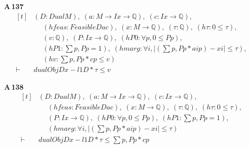 \noindent\textbf{A\,137}\quad{}
{\footnotesize\[ \begin{aligned}[t]
&(\mathit{D} : \mathit{Dual} \mathit{M}),\; (\mathit{a} : \mathit{M} \to \mathit{Ix} \to \mathbb{Q} ),\; (\mathit{c} : \mathit{Ix} \to \mathbb{Q} ),\\
&\quad \; (\mathit{hfeas} : \mathit{Feasible} \mathit{D} \mathit{a} \mathit{c}),\; (\mathit{x} : \mathit{M} \to \mathbb{Q} ),\; (\tau : \mathbb{Q} ),\; (\mathit{hτ} : 0 \leq \tau ),\\
&\quad \; (\mathit{v} : \mathbb{Q} ),\; (\mathit{P} : \mathit{Ix} \to \mathbb{Q} ),\; (\mathit{hP0} : \forall \mathit{p}, 0 \leq \mathit{P} \mathit{p}),\\
&\quad \; (\mathit{hP1} : \textstyle\sum \mathit{p}, \mathit{P} \mathit{p} = 1),\; (\mathit{hmarg} : \forall \mathit{i}, |(\textstyle\sum \mathit{p}, \mathit{P} \mathit{p} * \mathit{a} \mathit{i} \mathit{p}) - \mathit{x} \mathit{i}| \leq \tau ),\\
&\quad \; (\mathit{hv} : \textstyle\sum \mathit{p}, \mathit{P} \mathit{p} * \mathit{c} \mathit{p} \leq \mathit{v})\\
\vdash\;&\mathit{dualObj} \mathit{D} \mathit{x} - \mathit{l1} \mathit{D} * \tau \leq \mathit{v}
\end{aligned} \]}

\noindent\textbf{A\,138}\quad{}
{\footnotesize\[ \begin{aligned}[t]
&(\mathit{D} : \mathit{Dual} \mathit{M}),\; (\mathit{a} : \mathit{M} \to \mathit{Ix} \to \mathbb{Q} ),\; (\mathit{c} : \mathit{Ix} \to \mathbb{Q} ),\\
&\quad \; (\mathit{hfeas} : \mathit{Feasible} \mathit{D} \mathit{a} \mathit{c}),\; (\mathit{x} : \mathit{M} \to \mathbb{Q} ),\; (\tau : \mathbb{Q} ),\; (\mathit{hτ} : 0 \leq \tau ),\\
&\quad \; (\mathit{P} : \mathit{Ix} \to \mathbb{Q} ),\; (\mathit{hP0} : \forall \mathit{p}, 0 \leq \mathit{P} \mathit{p}),\; (\mathit{hP1} : \textstyle\sum \mathit{p}, \mathit{P} \mathit{p} = 1),\\
&\quad \; (\mathit{hmarg} : \forall \mathit{i}, |(\textstyle\sum \mathit{p}, \mathit{P} \mathit{p} * \mathit{a} \mathit{i} \mathit{p}) - \mathit{x} \mathit{i}| \leq \tau )\\
\vdash\;&\mathit{dualObj} \mathit{D} \mathit{x} - \mathit{l1} \mathit{D} * \tau \leq \textstyle\sum \mathit{p}, \mathit{P} \mathit{p} * \mathit{c} \mathit{p}
\end{aligned} \]}

